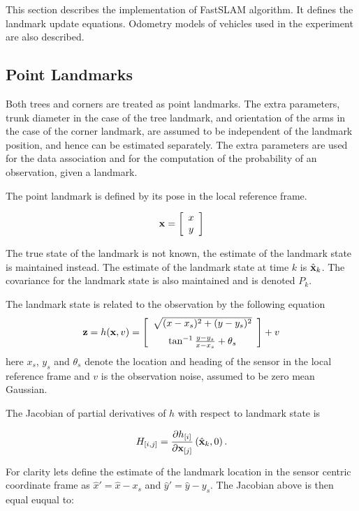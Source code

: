 This section describes the implementation of FastSLAM algorithm. It
defines the landmark update equations. Odometry models of vehicles
used in the experiment are also described.


\subsection{Point Landmarks}

Both trees and corners are treated as point landmarks. The extra
parameters, trunk diameter in the case of the tree landmark, and
orientation of the arms in the case of the corner landmark, are
assumed to be independent of the landmark position, and hence can be
estimated separately. The extra parameters are used for the data
association and for the computation of the probability of an
observation, given a landmark.

The point landmark is defined by its pose in the local reference
frame.

$$
{\bf x} = \left[ \begin{array}{c} x\\y \end{array} \right]
$$

The true state of the landmark is not known, the estimate of the
landmark state is maintained instead. The estimate of the landmark
state at time $k$ is $\hat{\bf x}_k$. The covariance for the landmark
state is also maintained and is denoted $P_k$.

The landmark state is related to the observation by the following equation
$$
  {\bf z} = h({\bf x},v) = \left[
\begin{array}{c}
\sqrt{(x-x_s)^2 + (y-y_s)^2}\\ \noalign{\medskip}
\tan^{-1} \frac{y-y_s}{x-x_s} + \theta_s
\end{array}
\right] + v
$$
here $x_s$, $y_s$ and $\theta_s$ denote the location and heading of
the sensor in the local reference frame and $v$ is the observation noise,
assumed to be zero mean Gaussian.

The Jacobian of partial derivatives of $h$ with respect to landmark
state is

$$
H_{[i,j]} = \frac{\partial h_{[i]}}{\partial {\bf x}_{[j]}}
             \left(\hat{\bf x}_k , 0 \right).
$$

For clarity lets define the estimate of the landmark location in the
sensor centric coordinate frame as $\hat{x}' = \hat{x} - x_s$ and
$\hat{y}' = \hat{y} - y_s$. The Jacobian above is then equal euqual to:

